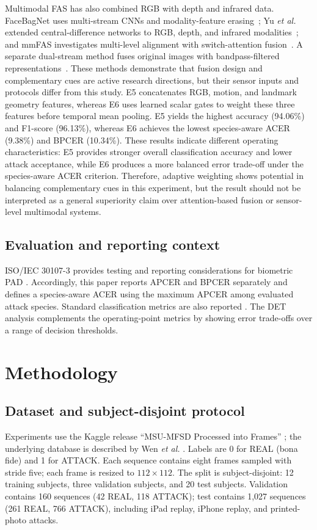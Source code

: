 \documentclass[a4paper,conference]{IEEEtran}
\begin{document}
Multimodal FAS has also combined RGB with depth and infrared data. FaceBagNet uses multi-stream CNNs and modality-feature erasing~\cite{shen2019facebagnet}; Yu \emph{et al.} extended central-difference networks to RGB, depth, and infrared modalities~\cite{yu2020multimodal}; and mmFAS investigates multi-level alignment with switch-attention fusion~\cite{chen2025mmfas}. A separate dual-stream method fuses original images with bandpass-filtered representations~\cite{zeng2023bandpass}. These methods demonstrate that fusion design and complementary cues are active research directions, but their sensor inputs and protocols differ from this study. E5 concatenates RGB, motion, and landmark geometry features, whereas E6 uses learned scalar gates to weight these three features before temporal mean pooling. E5 yields the highest accuracy (94.06\%) and F1-score (96.13\%), whereas E6 achieves the lowest species-aware ACER (9.38\%) and BPCER (10.34\%). These results indicate different operating characteristics: E5 provides stronger overall classification accuracy and lower attack acceptance,
while E6 produces a more balanced error trade-off under the species-aware ACER criterion. Therefore, adaptive weighting shows potential in balancing complementary cues in this experiment, but the result should not be interpreted as a general superiority claim over attention-based fusion or
sensor-level multimodal systems.

\subsection{Evaluation and reporting context}
ISO/IEC 30107-3 provides testing and reporting considerations for biometric PAD \cite{iso30107}. Accordingly, this paper reports APCER and BPCER separately and defines a species-aware ACER using the maximum APCER among evaluated attack species. Standard classification metrics are also reported \cite{sokolova2009}. The DET analysis complements the operating-point metrics by showing error trade-offs over a range of decision thresholds.

\section{Methodology}
\subsection{Dataset and subject-disjoint protocol}
Experiments use the Kaggle release ``MSU-MFSD Processed into Frames'' \cite{kagglemsumfsd}; the underlying database is described by Wen \emph{et al.} \cite{wen2015ida}. Labels are 0 for REAL (bona fide) and 1 for ATTACK. Each sequence contains eight frames sampled with stride five; each frame is resized to $112\times112$. The split is subject-disjoint: 12 training subjects, three validation subjects, and 20 test subjects. Validation contains 160 sequences (42 REAL, 118 ATTACK); test contains 1,027 sequences (261 REAL, 766 ATTACK), including iPad replay, iPhone replay, and printed-photo attacks.
\end{document}
